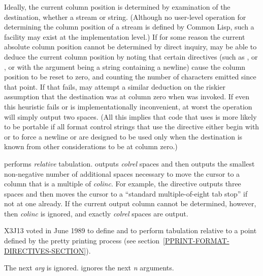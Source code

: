 \begin{flushdesc}
Ideally, the current column position is determined by examination of the
destination, whether a stream or string. (Although no user-level
operation for determining the column position of a stream is defined
by Common Lisp, such a facility may exist at the implementation level.)
If for some reason the current absolute column position cannot be determined
by direct inquiry,
 may be able to deduce the current column position by noting
that certain directives (such as \cd{{\Xtilde}\%}, or \cd{{\Xtilde}\&},
or  with the argument being a string containing a newline) cause
the column position to be reset to zero, and counting the number of characters
emitted since that point.  If that fails,  may attempt a
similar deduction on the riskier assumption that the destination was
at column zero when  was invoked.  If even this heuristic fails
or is implementationally inconvenient, at worst
the  operation will simply output two spaces.
(All this implies that code that uses  is
more likely to be portable if all format control strings that use 
the  directive either begin with \cd{{\Xtilde}\%} or \cd{{\Xtilde}\&}
to force a newline
or are designed to be used only when the destination is known from other
considerations to be at column zero.)

 performs {\it relative} tabulation.
 outputs {\it colrel} spaces
and then outputs the smallest non-negative
number of additional spaces necessary to move the cursor
to a column that is a multiple
of {\it colinc}.  For example, the directive  outputs
three spaces and then moves the cursor to a ``standard multiple-of-eight
tab stop'' if not at one already.
If the current output column cannot be determined, however,
then {\it colinc} is ignored, and exactly {\it colrel} spaces are output.

\begin{new}
X3J13 voted in June 1989  to define 
and  to perform tabulation relative to a point defined
by the pretty printing process (see section~\ref{PPRINT-FORMAT-DIRECTIVES-SECTION}).
\end{new}

\item[\cd{{\Xtilde}*}]
The next {\it arg} is ignored.   ignores the next {\it n} arguments.


\end{flushdesc}
